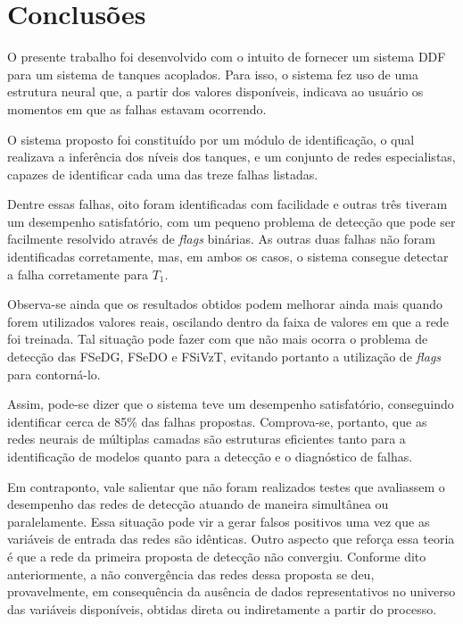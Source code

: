 \label{cap:conclusoes}

\section{Conclusões}
O presente trabalho foi desenvolvido com o intuito de fornecer um sistema DDF
para um sistema de tanques acoplados. Para isso, o sistema fez uso de uma
estrutura neural que, a partir dos valores disponíveis, indicava ao usuário os
momentos em que as falhas estavam ocorrendo.

O sistema proposto foi constituído por um módulo de identificação, o qual
realizava a inferência dos níveis dos tanques, e um conjunto de redes
especialistas, capazes de identificar cada uma das treze falhas listadas.

Dentre essas falhas, oito foram identificadas com facilidade e outras três
tiveram um desempenho satisfatório, com um pequeno problema de detecção que pode
ser facilmente resolvido através de {\it flags} binárias. As outras duas falhas
não foram identificadas corretamente, mas, em ambos os casos, o sistema consegue
detectar a falha corretamente para $T_1$.

Observa-se ainda que os resultados obtidos podem melhorar ainda mais quando
forem utilizados valores reais, oscilando dentro da faixa de valores em que a
rede foi treinada. Tal situação pode fazer com que não mais ocorra o problema de
detecção das FSeDG, FSeDO e FSiVzT, evitando portanto a utilização de {\it
flags} para contorná-lo.

Assim, pode-se dizer que o sistema teve um desempenho satisfatório, conseguindo
identificar cerca de 85\% das falhas propostas. Comprova-se, portanto, que as
redes neurais de múltiplas camadas são estruturas eficientes tanto para a
identificação de modelos quanto para a detecção e o diagnóstico de falhas.

Em contraponto, vale salientar que não foram realizados testes que avaliassem o
desempenho das redes de detecção atuando de maneira simultânea ou paralelamente.
Essa situação pode vir a gerar falsos positivos uma vez que as variáveis de
entrada das redes são idênticas. Outro aspecto que reforça essa teoria é que a
rede da primeira proposta de detecção não convergiu. Conforme dito
anteriormente, a não convergência das redes dessa proposta se deu,
provavelmente, em consequência da ausência de dados representativos no universo
das variáveis disponíveis, obtidas direta ou indiretamente a partir do processo.

